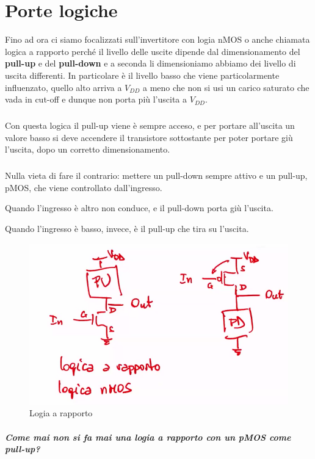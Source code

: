 \chapter{Porte logiche}

Fino ad ora ci siamo focalizzati sull'invertitore con logia nMOS o anche chiamata logica a rapporto perché il livello delle uscite dipende dal dimensionamento del \textbf{pull-up} e del \textbf{pull-down} e a seconda li dimensioniamo abbiamo dei livello di uscita differenti. In particolare è il livello basso che viene particolarmente influenzato, quello alto arriva a $V_{DD}$ a meno che non si usi un carico saturato che vada in cut-off e dunque non porta più l'uscita a $V_{DD}$.

\paragraph{}
Con questa logica il pull-up viene è sempre acceso, e per portare all'uscita un valore basso si deve accendere il transistore sottostante per poter portare giù l'uscita, dopo un corretto dimensionamento.
\paragraph{}
Nulla vieta di fare il contrario: mettere un pull-down sempre attivo e un pull-up, pMOS, che viene controllato dall'ingresso.

Quando l'ingresso è altro non conduce, e il pull-down porta giù l'uscita.

Quando l'ingresso è basso, invece, è il pull-up che tira su l'uscita.

\begin{figure}[htbp]
    \centering
    \includegraphics[width=0.5\linewidth]{img/logia_a_rapporto.png}
    \caption{Logia a rapporto}
    
\end{figure}

\paragraph{Come mai non si fa mai una logia a rapporto con un pMOS come pull-up?}

